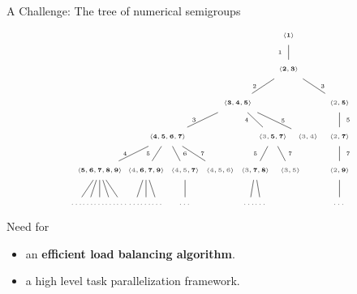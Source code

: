 \documentclass{beamer}
\begin{document}
\begin{frame}[fragile]{A Challenge: The tree of numerical semigroups}
\newcommand{\sgnode}[1]{{\bf \left<#1\right>}}
\newcommand{\gr}[1]{{\color{gray} #1}}
\[\tiny
\begin{tikzpicture}[baseline={([yshift=-5cm]current bounding box.north)},
  scale=0.7,
  level distance=1.5cm, 
  inner sep=2mm,
  level/.style={sibling distance=1.55cm}]
    \node {$\sgnode{1}$}
    child {node {$\sgnode{2,3}$}
      child [sibling distance=4.5cm] {node {$\sgnode{3,4,5}$}
        child {node {$\sgnode{4,5,6,7}$}
          child [sibling distance=2cm]{node {$\sgnode{5,6,7,8,9}$}
            child[sibling distance=0.5cm] {node {$\dots$} edge from parent}
            child[sibling distance=0.5cm] {node {$\dots$} edge from parent}
            child[sibling distance=0.5cm] {node {$\dots$} edge from parent}
            child[sibling distance=0.5cm] {node {$\dots$} edge from parent}
            child[sibling distance=0.5cm] {node {$\dots$} edge from parent}
            edge from parent node [left] {4}}
          child [sibling distance=1.9cm]{node {$\sgnode{\gr 4,6,7,9}$}
            child[sibling distance=0.5cm] {node {$\dots$} edge from parent}
            child[sibling distance=0.5cm] {node {$\dots$} edge from parent}
            child[sibling distance=0.5cm] {node {$\dots$} edge from parent}
            edge from parent node [left] {5}}
          child {node {$\sgnode{\gr 4,\gr 5,7}$}
            child[sibling distance=0.5cm] {node {$\dots$} edge from parent}
            edge from parent node [right] {6}}
          child {node {$\sgnode{\gr 4,\gr 5,\gr 6}$}
            edge from parent node [right] {7}}
          edge from parent node [left] {3}
        }
        child{{} edge from parent[draw=none]}
        child{{} edge from parent[draw=none]}
        child {node {$\sgnode{\gr 3,5,7}$}
          child {node {$\sgnode{\gr 3,7,8}$}
            child[sibling distance=0.5cm] {node {$\dots$} edge from parent}
            child[sibling distance=0.5cm] {node {$\dots$} edge from parent}
            edge from parent node [left] {5}}
          child {node {$\sgnode{\gr 3,\gr 5}$} edge from parent node [right] {7}}
          edge from parent node [left] {4}
        }
        child {node {$\sgnode{\gr 3,\gr 4}$}
          edge from parent node [right] {5}
        }
        edge from parent node [left] {2}
      }
      child [sibling distance=4.5cm] {node {$\sgnode{\gr2,5}$}
        child {node {$\sgnode{\gr2,7}$}
          child {node {$\sgnode{\gr2,9}$}
            child[sibling distance=0.5cm] {node {$\dots$} edge from parent}
            edge from parent node [right] {7}
          }
          edge from parent node [right] {5}
        }
        edge from parent node [right] {3}
      }
      edge from parent node [left] {1}
    }
   ;
  \end{tikzpicture}
\]
\pause
Need for
\begin{itemize}
\item an \textbf{efficient load balancing algorithm}.
\item a high level task parallelization framework. 
\end{itemize}
\end{frame}
\end{document}

